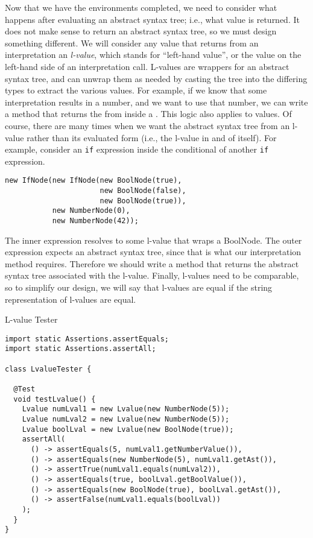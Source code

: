 Now that we have the environments completed, we need to consider what happens after evaluating an abstract syntax tree; i.e., what value is returned. It does not make sense to return an abstract syntax tree, so we must design something different. We will consider any value that returns from an interpretation an \textit{l-value}, which stands for ``left-hand value'', or the value on the left-hand side of an interpretation call. L-values are wrappers for an abstract syntax tree, and can unwrap them as needed by casting the tree into the differing types to extract the various values. For example, if we know that some interpretation results in a number, and we want to use that number, we can write a method that returns the  from inside a . This logic also applies to  values. Of course, there are many times when we want the abstract syntax tree from an l-value rather than its evaluated form (i.e., the l-value in and of itself). For example, consider an \texttt{if} expression inside the conditional of another \texttt{if} expression. 
\begin{verbatim}
new IfNode(new IfNode(new BoolNode(true), 
                      new BoolNode(false), 
                      new BoolNode(true)), 
           new NumberNode(0), 
           new NumberNode(42));
\end{verbatim}
The inner  expression resolves to some l-value that wraps a BoolNode. The outer  expression expects an abstract syntax tree, since that is what our interpretation method requires. Therefore we should write a method that returns the abstract syntax tree associated with the l-value. Finally, l-values need to be comparable, so to simplify our design, we will say that l-values are equal if the string representation of l-values are equal.
\begin{cl}{L-value Tester}
\begin{lstlisting}[language=MyJava]
import static Assertions.assertEquals;
import static Assertions.assertAll;

class LvalueTester {
  
  @Test
  void testLvalue() {
    Lvalue numLval1 = new Lvalue(new NumberNode(5));
    Lvalue numLval2 = new Lvalue(new NumberNode(5));
    Lvalue boolLval = new Lvalue(new BoolNode(true));
    assertAll(
      () -> assertEquals(5, numLval1.getNumberValue()),
      () -> assertEquals(new NumberNode(5), numLval1.getAst()),
      () -> assertTrue(numLval1.equals(numLval2)),
      () -> assertEquals(true, boolLval.getBoolValue()),
      () -> assertEquals(new BoolNode(true), boolLval.getAst()),
      () -> assertFalse(numLval1.equals(boolLval))
    );
  }
}
\end{lstlisting}
\end{cl}

